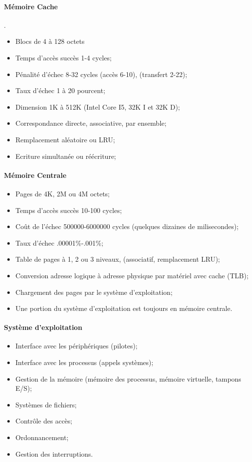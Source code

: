 \documentclass[oneside]{book}
\begin{document}
\paragraph{Mémoire Cache}
.\\
\begin{itemize}
\item Blocs de 4 à 128 octets
\item Temps d'accès succès 1-4 cycles;
\item Pénalité d'échec 8-32 cycles (accès 6-10), (transfert 2-22);
\item Taux d'échec 1 à 20 pourcent;
\item Dimension 1K à 512K (Intel Core I5, 32K I et 32K D);
\item Correspondance directe, associative, par ensemble;
\item Remplacement aléatoire ou LRU;
\item Ecriture simultanée ou réécriture;
\end{itemize}


\paragraph{Mémoire Centrale}
\begin{itemize}
\item Pages de 4K, 2M ou 4M octets;
\item Temps d'accès succès 10-100 cycles;
\item Coût de l'échec 500000-6000000 cycles (quelques dizaines de
milisecondes);
\item Taux d'échec .00001\%-.001\%;
\item Table de pages à 1, 2 ou 3 niveaux, (associatif, remplacement LRU);
\item Conversion adresse logique à adresse physique par matériel avec
cache (TLB);
\item Chargement des pages par le système d'exploitation;
\item Une portion du système d'exploitation est toujours en mémoire centrale.
\end{itemize}
\paragraph{Système d'exploitation}
\begin{itemize}
\item Interface avec les périphériques (pilotes);
\item Interface avec les processus (appels systèmes);
\item Gestion de la mémoire (mémoire des processus, mémoire
virtuelle, tampons E/S);
\item Systèmes de fichiers;
\item Contrôle des accès;
\item Ordonnancement;
\item Gestion des interruptions.
\end{itemize}
\end{document}
